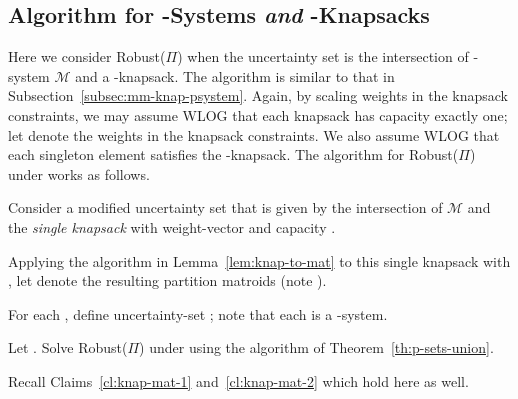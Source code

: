 \documentclass[11pt,letterpaper]{article}
\def\ms{\ensuremath{\mathcal{M}}\xspace}
\def\cov{\ensuremath{\Pi}\xspace}
\def\rcov{{\sf Robust(\cov)}\xspace}
\newcounter{note}[section]
\begin{document}
\subsection{Algorithm for -Systems {\em and } -Knapsacks }
Here we consider \rcov when the uncertainty set  is the intersection of   -system \ms and a -knapsack.
The algorithm is similar to that in Subsection~\ref{subsec:mm-knap-psystem}. Again, by scaling weights in the knapsack
constraints, we may assume WLOG that each knapsack has capacity exactly one; let  denote the weights in
the  knapsack constraints. We also assume WLOG that each singleton element satisfies the -knapsack. The algorithm
for \rcov under  works as follows.

\begin{algorithm}
\caption{Algorithm Robust with -system and -knapsack Uncertainty Set}
  \begin{algorithmic}[1]
  \STATE Consider a modified uncertainty set  that is given by the intersection of \ms and the {\em single knapsack}
with weight-vector  and capacity .

  \STATE Applying the algorithm in Lemma~\ref{lem:knap-to-mat} to  this single knapsack with , let
 denote the resulting partition matroids (note ).

  \STATE For each , define uncertainty-set ; note that each  is a
-system.

  \STATE Let  . Solve \rcov under  using the algorithm of
  Theorem~\ref{th:p-sets-union}.
\end{algorithmic}
\end{algorithm}

Recall Claims~\ref{cl:knap-mat-1} and~\ref{cl:knap-mat-2} which hold here as well.
\end{document}
